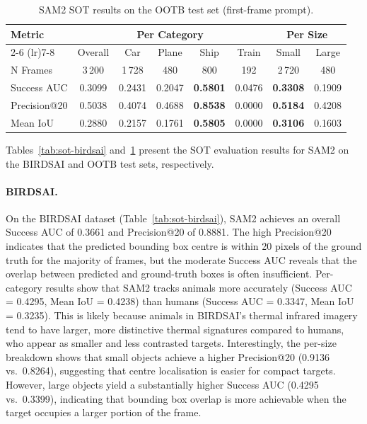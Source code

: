 \documentclass[
]{article}
\begin{document}
\begin{table}[htbp]
\centering
\begin{tabular}{l ccccc cc}
\toprule
\textbf{Metric} & \multicolumn{5}{c}{\textbf{Per Category}} & \multicolumn{2}{c}{\textbf{Per Size}} \\
\cmidrule(lr){2-6} \cmidrule(lr){7-8}
 & Overall & Car & Plane & Ship & Train & Small & Large \\
\midrule
N Frames      & 3\,200 & 1\,728 & 480    & 800    & 192   & 2\,720 & 480    \\
Success AUC   & 0.3099 & 0.2431 & 0.2047 & \textbf{0.5801} & 0.0476 & \textbf{0.3308} & 0.1909 \\
Precision@20  & 0.5038 & 0.4074 & 0.4688 & \textbf{0.8538} & 0.0000 & \textbf{0.5184} & 0.4208 \\
Mean IoU      & 0.2880 & 0.2157 & 0.1761 & \textbf{0.5805} & 0.0000 & \textbf{0.3106} & 0.1603 \\
\bottomrule
\end{tabular}
\caption{SAM2 SOT results on the OOTB test set (first-frame prompt).}
\label{tab:sot-ootb}
\end{table}

Tables~\ref{tab:sot-birdsai} and~\ref{tab:sot-ootb} present the SOT evaluation results for SAM2 on the BIRDSAI and OOTB test sets, respectively.

\paragraph{BIRDSAI.}
On the BIRDSAI dataset (Table~\ref{tab:sot-birdsai}), SAM2 achieves an overall Success AUC of 0.3661 and Precision@20 of 0.8881. The high Precision@20 indicates that the predicted bounding box centre is within 20 pixels of the ground truth for the majority of frames, but the moderate Success AUC reveals that the overlap between predicted and ground-truth boxes is often insufficient. Per-category results show that SAM2 tracks animals more accurately (Success AUC = 0.4295, Mean IoU = 0.4238) than humans (Success AUC = 0.3347, Mean IoU = 0.3235). This is likely because animals in BIRDSAI's thermal infrared imagery tend to have larger, more distinctive thermal signatures compared to humans, who appear as smaller and less contrasted targets. Interestingly, the per-size breakdown shows that small objects achieve a higher Precision@20 (0.9136 vs.\ 0.8264), suggesting that centre localisation is easier for compact targets. However, large objects yield a substantially higher Success AUC (0.4295 vs.\ 0.3399), indicating that bounding box overlap is more achievable when the target occupies a larger portion of the frame.
\end{document}
